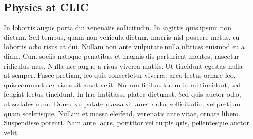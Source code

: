 \subsection{Physics at CLIC}

In lobortis augue porta dui venenatis sollicitudin. In sagittis quis ipsum non dictum. Sed tempus, quam non vehicula dictum, mauris nisl posuere metus, eu lobortis odio risus at dui. Nullam non ante vulputate nulla ultrices euismod eu a diam. Cum sociis natoque penatibus et magnis dis parturient montes, nascetur ridiculus mus. Nulla nec augue a risus viverra mattis. Ut tincidunt egestas nulla at semper. Fusce pretium, leo quis consectetur viverra, arcu lectus ornare leo, quis commodo ex risus sit amet velit. Nullam finibus lorem in mi tincidunt, sed feugiat lectus tincidunt. In hac habitasse platea dictumst. Sed quis auctor odio, at sodales nunc. Donec vulputate massa sit amet dolor sollicitudin, vel pretium quam scelerisque. Nullam et massa eleifend, venenatis ante vitae, ornare libero. Suspendisse potenti. Nam ante lacus, porttitor vel turpis quis, pellentesque auctor velit.



